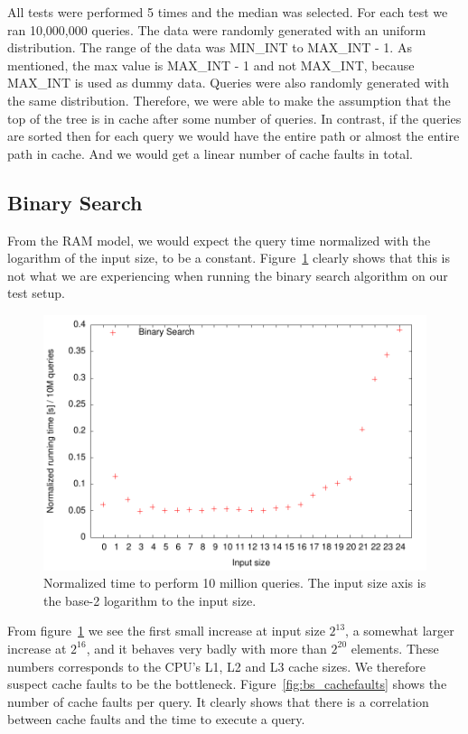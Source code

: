 
All tests were performed 5 times and the median was selected. For each
test we ran 10,000,000 queries. The data were randomly generated with
an uniform distribution. The range of the data was MIN\_INT to
MAX\_INT - 1. As mentioned, the max value is MAX\_INT - 1 and not
MAX\_INT, because MAX\_INT is used as dummy data. Queries were also
randomly generated with the same distribution. Therefore, we were able
to make the assumption that the top of the tree is in cache after some
number of queries. In contrast, if the queries are sorted then for
each query we would have the entire path or almost the entire path in
cache. And we would get a linear number of cache faults in total.

\subsection{Binary Search}
From the RAM model, we would expect the query time normalized with the
logarithm of the input size, to be a
constant. Figure~\ref{fig:bs_runningtime} clearly shows that this is
not what we are experiencing when running the binary search algorithm on our
test setup.

\begin{figure}[h!]
  \centering
  \includegraphics[width=\textwidth]{../week1/plots/outputs/bs_runningtime}
  \caption{Normalized time to perform 10 million queries. The input
    size axis is the base-2 logarithm to the input size.}
  \label{fig:bs_runningtime}
\end{figure}

From figure~\ref{fig:bs_runningtime} we see the first small increase
at input size \(2^{13}\), a somewhat larger increase at \(2^{16}\),
and it behaves very badly with more than \(2^{20}\) elements.
These numbers corresponds to the CPU's L1, L2 and L3 cache sizes. We
therefore suspect cache faults to be the
bottleneck. Figure~\ref{fig:bs_cachefaults} shows the number of cache
faults per query. It clearly shows that there is a correlation between cache faults and the time to execute a query.

